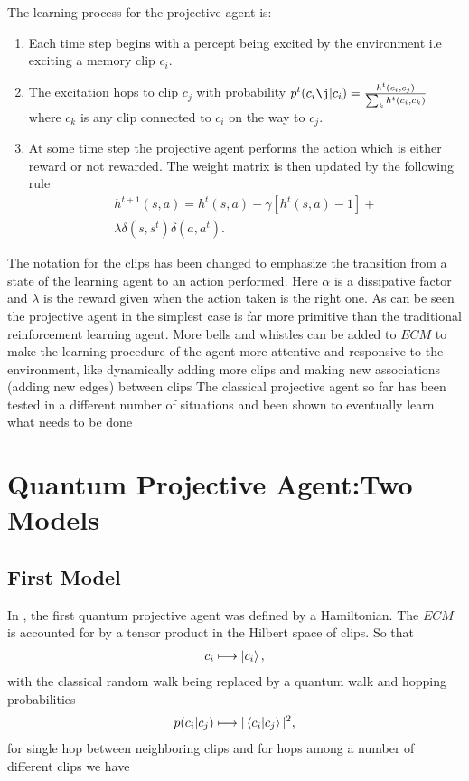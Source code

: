 \documentclass[twocolumn,prX,longbibliography]{revtex4}
\begin{document}
The learning process for the projective agent is:
\begin{enumerate}
 \item Each time step begins with a percept being excited by the environment i.e exciting a memory clip \(c_i\).
 \item The excitation hops to clip \(c_j\) with probability
  \(p^t(c_i\j|c_i) = \frac{h^t(c_i, c_j)}{\sum_k h^t(c_i, c_k)} \) where \(c_k\) is any clip connected to \(c_i\) on the way to \(c_j\).
  \item At some time step the projective agent performs the action which is either reward or not rewarded. The weight matrix is then updated by the following rule
  \begin{equation} 
  \begin{split}
      h^{t+1}(s, a) =  h^{t}(s,a) - \gamma[ h^{t}(s,a)-1] +\\ \lambda \delta(s,s^t)\delta(a,a^t).
  \end{split}
  \end{equation}
\end{enumerate}
The notation for the clips has been changed to emphasize the transition from a state of the learning agent to an action performed. Here \( \alpha \) is a dissipative factor and \(\lambda \) is the reward given when the action taken is the right one.
\newline
\indent As can be seen the projective agent in the simplest case is far more primitive than the traditional reinforcement learning agent. More bells and whistles can be added to \( ECM\) to make the learning procedure of the agent more attentive and responsive to the environment, like dynamically adding more clips and making new associations (adding new edges) between clips \cite{J.Briegel2012}
The classical projective agent so far has been tested in a different number of situations and been shown to eventually learn what needs to be done \cite{M.Tiersch2015,Friis2015,Melnikov2015} 

\section{Quantum Projective Agent:\newline Two Models}
 \subsection{First Model}
In \cite{J.Briegel2012}, the first quantum projective agent was defined by a Hamiltonian. The \(ECM\) is accounted for by a tensor product in the Hilbert space of clips.  So that 
\begin{align}
 c_i \longmapsto \ket{c_i} ,
\end{align}
with the classical random walk being replaced by a quantum walk and hopping probabilities
\begin{align} 
	p(c_i|c_j)\longmapsto
	 \vert\braket{c_i|c_j} \vert^2,
\end{align}  for single hop between neighboring clips and for hops among a number of different clips we have
\end{document}
